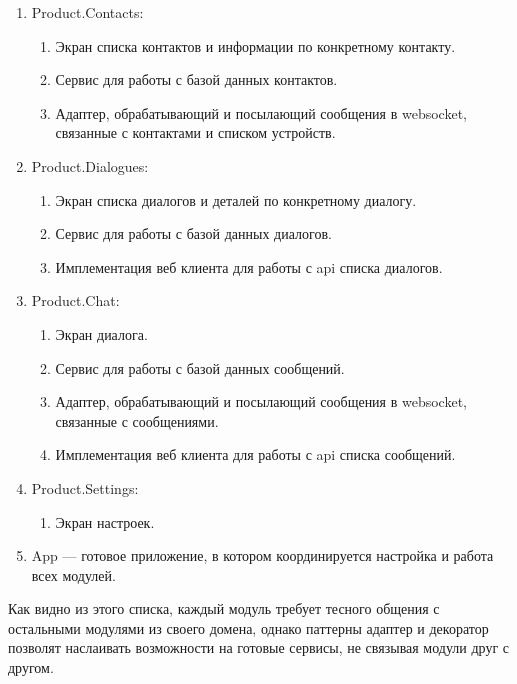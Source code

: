 \begin{enumerate}
	\item Product.Contacts:
	\begin{enumerate}
		\item Экран списка контактов и информации по конкретному контакту.
		\item Сервис для работы с базой данных контактов.
		\item Адаптер, обрабатывающий и посылающий сообщения в websocket, связанные с контактами и списком устройств.
	\end{enumerate}

	\item Product.Dialogues:
	\begin{enumerate}
		\item Экран списка диалогов и деталей по конкретному диалогу.
		\item Сервис для работы с базой данных диалогов.
		\item Имплементация веб клиента для работы с \gls{api} списка диалогов.
	\end{enumerate}

	\item Product.Chat:
	\begin{enumerate}
		\item Экран диалога.
		\item Сервис для работы с базой данных сообщений.
		\item Адаптер, обрабатывающий и посылающий сообщения в websocket, связанные с сообщениями.
		\item Имплементация веб клиента для работы с \gls{api} списка сообщений.
	\end{enumerate}

	\item Product.Settings:
	\begin{enumerate}
		\item Экран настроек.
	\end{enumerate}

	\item App --- готовое приложение, в котором координируется настройка и работа всех модулей.

\end{enumerate}

Как видно из этого списка, каждый модуль требует тесного общения с остальными модулями из своего домена, однако паттерны адаптер и декоратор позволят наслаивать возможности на готовые сервисы, не связывая модули друг с другом.